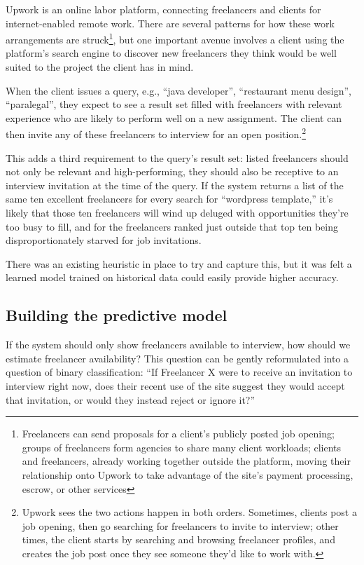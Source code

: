 \documentclass[tablecaption=bottom,wcp]{jmlr}
\begin{document}
 Upwork is an online labor platform, connecting freelancers and clients for
internet-enabled remote work. There are several patterns for how these work
arrangements are struck\footnote{Freelancers can send proposals for a client's
publicly posted job opening; groups of freelancers form agencies to share many
client workloads; clients and freelancers, already working together outside the
platform, moving their relationship onto Upwork to take advantage of the site's
payment processing, escrow, or other services}, but one important avenue
involves a client using the platform's search engine to discover new freelancers
they think would be well suited to the project the client has in mind.

 When the client issues a query, e.g., ``java developer'', ``restaurant menu
design'', ``paralegal'', they expect to see a result set filled with freelancers
with relevant experience who are likely to perform well on a new assignment. The
client can then invite any of these freelancers to interview for an open
position.\footnote{Upwork sees the two actions happen in both orders. Sometimes,
clients post a job opening, then go searching for freelancers to invite to
interview; other times, the client starts by searching and browsing freelancer
profiles, and creates the job post once they see someone they'd like to work
with.}

 This adds a third requirement to the query's result set: listed freelancers
should not only be relevant and high-performing, they should also be receptive
to an interview invitation at the time of the query. If the system returns a
list of the same ten excellent freelancers for every search for
``wordpress template,'' it's likely that those ten freelancers will wind up deluged
with opportunities they're too busy to fill, and for the freelancers ranked just
outside that top ten being disproportionately starved for job invitations.

 There was an existing heuristic in place to try and capture this, but it was
felt a learned model trained on historical data could easily provide higher
accuracy.

\subsection{Building the predictive model}

 If the system should only show freelancers available to interview, how should
we estimate freelancer availability? This question can be gently reformulated
into a question of binary classification: ``If Freelancer X were to receive an
invitation to interview right now, does their recent use of the site suggest
they would accept that invitation, or would they instead reject or ignore it?''
\end{document}

